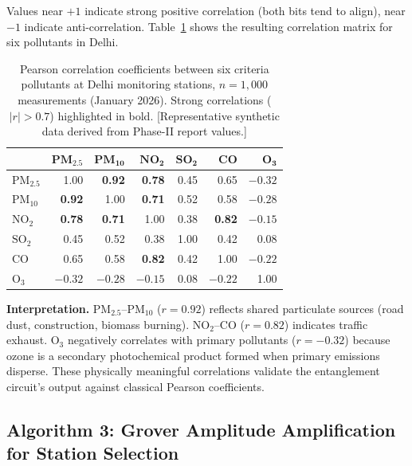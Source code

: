 \documentclass[12pt,a4paper]{article}
\begin{document}
\noindent Values near $+1$ indicate strong positive correlation (both bits
tend to align), near $-1$ indicate anti-correlation. Table~\ref{tab:correlations}
shows the resulting correlation matrix for six pollutants in Delhi.

\begin{table}[H]
\centering
\caption[Inter-pollutant correlation matrix for Delhi (January 2026)]{%
Pearson correlation coefficients between six criteria pollutants at Delhi
monitoring stations, $n = 1{,}000$ measurements (January 2026).
Strong correlations ($|r| > 0.7$) highlighted in bold.
[Representative synthetic data derived from Phase-II report values.]}
\label{tab:correlations}
\begin{tabular}{@{}lrrrrrr@{}}
\toprule
 & $\mathbf{PM_{2.5}}$ & $\mathbf{PM_{10}}$ & $\mathbf{NO_2}$
 & $\mathbf{SO_2}$ & $\mathbf{CO}$ & $\mathbf{O_3}$ \\
\midrule
$\text{PM}_{2.5}$ & 1.00 & \textbf{0.92} & \textbf{0.78} & 0.45 & 0.65 & $-0.32$ \\
$\text{PM}_{10}$  & \textbf{0.92} & 1.00 & \textbf{0.71} & 0.52 & 0.58 & $-0.28$ \\
$\text{NO}_2$     & \textbf{0.78} & \textbf{0.71} & 1.00 & 0.38 & \textbf{0.82} & $-0.15$ \\
$\text{SO}_2$     & 0.45 & 0.52 & 0.38 & 1.00 & 0.42 &  0.08  \\
$\text{CO}$       & 0.65 & 0.58 & \textbf{0.82} & 0.42 & 1.00 & $-0.22$ \\
$\text{O}_3$      & $-0.32$ & $-0.28$ & $-0.15$ & 0.08 & $-0.22$ & 1.00 \\
\bottomrule
\end{tabular}
\end{table}

\noindent\textbf{Interpretation.}
PM$_{2.5}$--PM$_{10}$ ($r = 0.92$) reflects shared particulate sources
(road dust, construction, biomass burning). NO$_2$--CO ($r = 0.82$)
indicates traffic exhaust. O$_3$ negatively correlates with primary
pollutants ($r = -0.32$) because ozone is a secondary photochemical product
formed when primary emissions disperse. These physically meaningful
correlations validate the entanglement circuit's output against classical
Pearson coefficients.

\subsection{Algorithm 3: Grover Amplitude Amplification for Station Selection}
\label{sec:quantum:grover}
\end{document}
